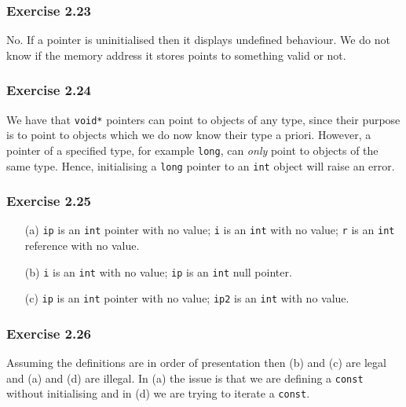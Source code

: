 \documentclass[12pt, a4paper]{article}
\begin{document}
\subsubsection*{Exercise 2.23}
No. If a pointer is uninitialised then it displays undefined behaviour. We do not know if the memory address it stores points to something valid or not.

\subsubsection*{Exercise 2.24}
We have that \texttt{void*} pointers can point to objects of any type, since their purpose is to point to objects which we do now know their type a priori. However, a pointer of a specified type, for example \texttt{long}, can \textit{only} point to objects of the same type. Hence, initialising a \texttt{long} pointer to an \texttt{int} object will raise an error.

\subsubsection*{Exercise 2.25}
\begin{itemize}
	\item [(a)]
		\texttt{ip} is an \texttt{int} pointer with no value; \texttt{i} is an \texttt{int} with no value; \texttt{r} is an \texttt{int} reference with no value.
	\item [(b)]
		\texttt{i} is an \texttt{int} with no value; \texttt{ip} is an \texttt{int} null pointer.
	\item [(c)]
		\texttt{ip} is an \texttt{int} pointer with no value; \texttt{ip2} is an \texttt{int} with no value.
\end{itemize}

\subsubsection*{Exercise 2.26}
Assuming the definitions are in order of presentation then (b) and (c) are legal and (a) and (d) are illegal. In (a) the issue is that we are defining a \texttt{const} without initialising and in (d) we are trying to iterate a \texttt{const}.
\end{document}
